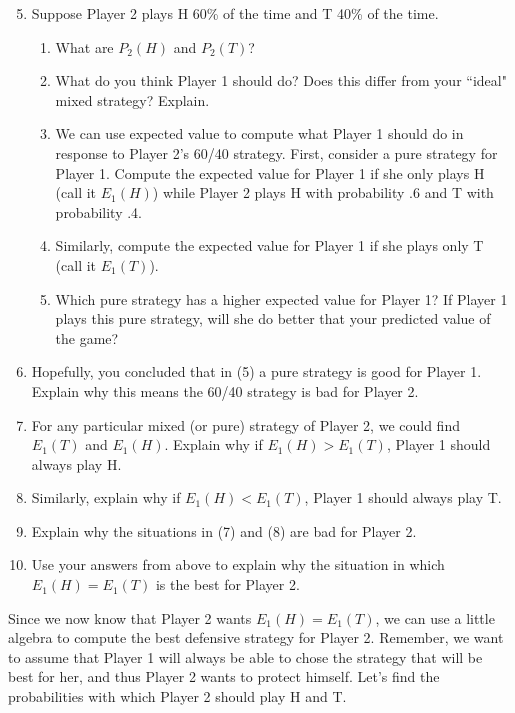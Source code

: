 \begin{enumerate}
\setcounter{enumi}{4}
\item Suppose Player 2 plays H 60\% of the time and T 40\% of the time. 
\begin{enumerate}
\item What are $P_2(H)$ and $P_2(T)$?
\item What do you think Player 1 should do? Does this differ from your ``ideal" mixed strategy? Explain.
\item We can use expected value to compute what Player 1 should do in response to Player 2's 60/40 strategy. First, consider a pure strategy for Player 1. Compute the expected value for Player 1 if she only plays H (call it $E_1(H)$) while Player 2 plays H with probability .6  and T with probability .4.
\item Similarly, compute the expected value for Player 1 if she plays only T (call it $E_1(T)$).
\item Which pure strategy has a higher expected value for Player 1? If Player 1 plays this pure strategy, will she do better that your predicted value of the game?\end{enumerate}
\vspace{.1 in}

\item Hopefully, you concluded that in (5) a pure strategy is good for Player 1. Explain why this means the 60/40 strategy is bad for Player 2.
\vspace{.1 in}

\item For any particular mixed (or pure) strategy of Player 2, we could find $E_1(T)$ and $E_1(H)$. Explain why if $E_1(H) > E_1(T)$, Player 1 should always play H. 
\vspace{.1in}

\item Similarly, explain why if $E_1(H) < E_1(T)$, Player 1 should always play T. 
\vspace{.1in}


\item Explain why the situations in (7) and (8) are bad for Player 2.
\vspace{.1in}
\item Use your answers from above to explain why the situation in which $E_1(H)=E_1(T)$ is the best for Player 2.
\vspace{.1in}
\end{enumerate}

Since we now know that Player 2 wants $E_1(H)=E_1(T)$, we can use a little algebra to compute the best defensive strategy for Player 2. Remember, we want to assume that Player 1 will always be able to chose the strategy that will be best for her, and thus Player 2 wants to protect himself. Let's find the probabilities with which Player 2 should play H  and T.

